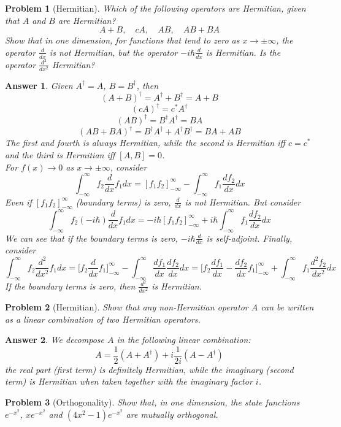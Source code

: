\documentclass[a4paper]{article}
\newtheorem{ans}{Answer}[section]
\theoremstyle{new}
\newtheorem{qns}{Problem}[section]
\begin{document}
\newpage
\begin{qns}[Hermitian]
Which of the following operators are Hermitian, given that $A$ and $B$ are Hermitian?
$$A+B,\quad cA,\quad AB,\quad AB+BA$$
Show that in one dimension, for functions that tend to zero as $x\rightarrow\pm\infty$, the operator $\frac{d}{dx}$ is not Hermitian, but the operator $-i\hbar\frac{d}{dx}$ is Hermitian. Is the operator $\frac{d^2}{dx^2}$ Hermitian?
\end{qns}
\begin{ans}
Given $A^\dag=A$, $B=B^\dag$, then
$$(A+B)^\dag=A^\dag+B^\dag=A+B$$
$$(cA)^\dag=c^*A^\dag$$
$$(AB)^\dag=B^\dag A^\dag=BA$$
$$(AB+BA)^\dag=B^\dag A^\dag+A^\dag B^\dag =BA+AB$$
The first and fourth is always Hermitian, while the second is Hermitian iff $c=c^*$ and the third is Hermitian iff $[A,B]=0$.\\[5pt]
For $f(x)\rightarrow0$ as $x\rightarrow\pm\infty$, consider
$$\int_{-\infty}^\infty f_2\frac{d}{dx}f_1dx=[f_1f_2]_{-\infty}^\infty -\int_{-\infty}^\infty f_1\frac{df_2}{dx}dx$$
Even if $[f_1f_2]^{\infty}_{-\infty}$ (boundary terms) is zero, $\frac{d}{dx}$ is not Hermitian. But consider
$$\int_{-\infty}^\infty f_2(-i\hbar)\frac{d}{dx}f_1dx=-i\hbar[f_1f_2]_{-\infty}^\infty +i\hbar\int_{-\infty}^\infty f_1\frac{df_2}{dx}dx$$
We can see that if the boundary terms is zero, $-i\hbar\frac{d}{dx}$ is self-adjoint. Finally, consider
$$\int_{-\infty}^\infty f_2\frac{d^2}{dx^2}f_1dx=\bigg[f_2\frac{d}{dx}f_1\bigg]_{-\infty}^\infty -\int_{-\infty}^\infty \frac{df_1}{dx}\frac{df_2}{dx}dx=\bigg[f_2\frac{df_1}{dx}-\frac{df_2}{dx}f_1\bigg]_{-\infty}^\infty+\int_{-\infty}^\infty f_1\frac{d^2f_2}{dx^2}dx$$
If the boundary terms is zero, then $\frac{d^2}{dx^2}$ is Hermitian.
\end{ans}
\begin{qns}[Hermitian]
Show that any non-Hermitian operator $A$ can be written as a linear combination of two Hermitian operators.
\end{qns}
\begin{ans}
We decompose $A$ in the following linear combination:
$$A=\frac{1}{2}(A+A^\dag)+i\frac{1}{2i}(A-A^\dag)$$
the real part (first term) is definitely Hermitian, while the imaginary (second term) is Hermitian when taken together with the imaginary factor $i$.
\end{ans}
\begin{qns}[Orthogonality]
Show that, in one dimension, the state functions $e^{-x^2}$, $xe^{-x^2}$ and $(4x^2-1)e^{-x^2}$ are mutually orthogonal.
\end{qns}
\end{document}
